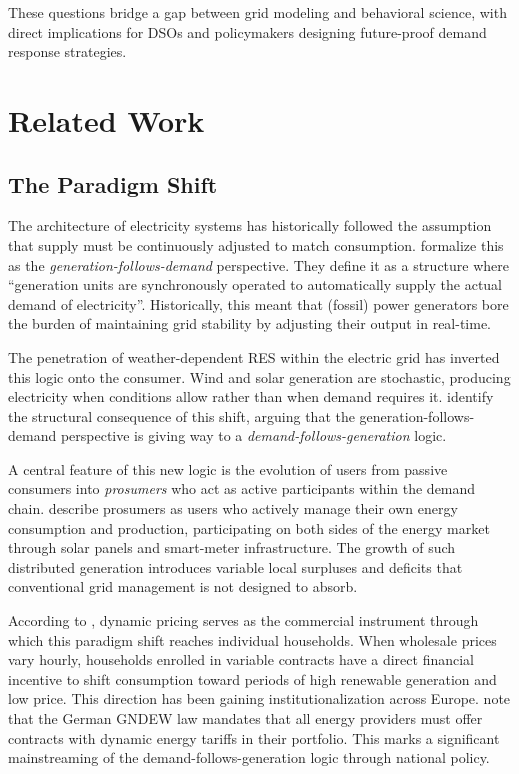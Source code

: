 \documentclass[11pt, a4paper]{article}
\begin{document}
These questions bridge a gap between grid modeling and behavioral science, with direct implications for DSOs and policymakers designing future-proof demand response strategies.

\section{Related Work}

\subsection{The Paradigm Shift} \label{subs:shift}
The architecture of electricity systems has historically followed the assumption that supply must be continuously adjusted to match consumption. \textcite[][p.~18]{eid_time-based_2016} formalize this as the \textit{generation-follows-demand} perspective. They define it as a structure where ``generation units are synchronously operated to automatically supply the actual demand of electricity''. Historically, this meant that (fossil) power generators bore the burden of maintaining grid stability by adjusting their output in real-time.

The penetration of weather-dependent RES within the electric grid has inverted this logic onto the consumer. Wind and solar generation are stochastic, producing electricity when conditions allow rather than when demand requires it. \textcite{eid_time-based_2016} identify the structural consequence of this shift, arguing that the generation-follows-demand perspective is giving way to a \textit{demand-follows-generation} logic.

A central feature of this new logic is the evolution of users from passive consumers into \textit{prosumers} who act as active participants within the demand chain. \textcite{parag_electricity_2016} describe prosumers as users who actively manage their own energy consumption and production, participating on both sides of the energy market through solar panels and smart-meter infrastructure. The growth of such distributed generation introduces variable local surpluses and deficits that conventional grid management is not designed to absorb.

According to \textcite{eid_time-based_2016}, dynamic pricing serves as the commercial instrument through which this paradigm shift reaches individual households. When wholesale prices vary hourly, households enrolled in variable contracts have a direct financial incentive to shift consumption toward periods of high renewable generation and low price. This direction has been gaining institutionalization across Europe. \textcite{johanning_integrative_2024} note that the German GNDEW law mandates that all energy providers must offer contracts with dynamic energy tariffs in their portfolio. This marks a significant mainstreaming of the demand-follows-generation logic through national policy. 
\pagebreak
\end{document}
